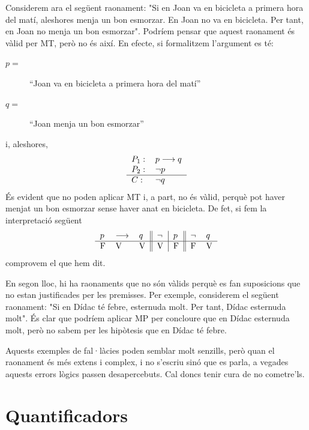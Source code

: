 \bigskip

Considerem ara el següent raonament: "Si en Joan va en bicicleta a
primera hora del matí, aleshores menja un bon esmorzar. En Joan no va
en bicicleta. Per tant, en Joan no menja un bon esmorzar". Podríem
pensar que aquest raonament és vàlid per MT, però no és així. En efecte, si formalitzem l'argument es té:

\begin{description}
\item[$p=$] \enquote{Joan va en bicicleta a primera hora del matí}

\item[$q=$] \enquote{Joan menja un bon esmorzar}
\end{description}

i, aleshores,\begin{equation*}
\begin{tabular}{ll}
$P_{1}:$ & $p\longrightarrow q$ \\
$P_{2}:$ & $\lnot p$ \\ \hline
$C:$ & $\lnot q$\end{tabular}
\end{equation*}
És evident que no poden aplicar MT i, a part, no és vàlid, perquè pot haver menjat un bon esmorzar sense haver anat en bicicleta. De
fet, si fem la interpretació següent\begin{equation*}
\begin{tabular}{lll||l|l||ll}
$p$ & $\longrightarrow$ & $q$ & $\lnot$ & $p$ & $\lnot$ & $q$ \\ \hline
F & V & V & V & F & F & V\end{tabular}
\end{equation*}
comprovem el que hem dit.

\bigskip

En segon lloc, hi ha raonaments que no són vàlids perquè es fan
suposicions que no estan justificades per les premisses. Per exemple,
considerem el següent raonament: "Si en Dídac té febre,
esternuda molt. Per tant, Dídac esternuda molt". És clar que podríem aplicar MP per concloure que en Dídac esternuda molt, però
no sabem per les hipòtesis que en Dídac té febre.

Aquests exemples de fal·làcies poden semblar molt
senzills, però quan el raonament és més extens i complex, i no
s'escriu sinó que es parla, a vegades aquests errors lògics passen
desapercebuts. Cal doncs tenir cura de no cometre'ls.

\section{Quantificadors}

